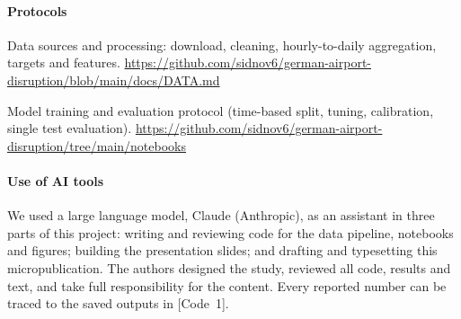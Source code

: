 \documentclass[10pt,a4paper,epsf,apalike]{article}
\newcommand{\repo}{https://github.com/sidnov6/german-airport-disruption}
\begin{document}
\paragraph{Protocols}
\begin{enumerate}[label={[\arabic*]}]
\item Data sources and processing: download, cleaning, hourly-to-daily aggregation, targets and features. \url{\repo/blob/main/docs/DATA.md}
\item Model training and evaluation protocol (time-based split, tuning, calibration, single test evaluation). \url{\repo/tree/main/notebooks}
\end{enumerate}

\paragraph{Use of AI tools}
We used a large language model, Claude (Anthropic), as an assistant in three parts of this project: writing and reviewing code for the data pipeline, notebooks and figures; building the presentation slides; and drafting and typesetting this micropublication. The authors designed the study, reviewed all code, results and text, and take full responsibility for the content. Every reported number can be traced to the saved outputs in [Code~1].
\end{document}
